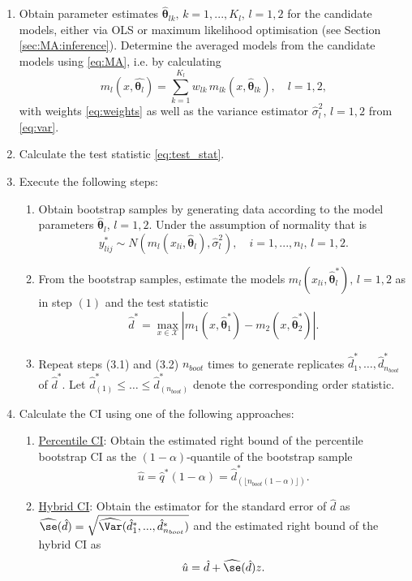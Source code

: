 {\begin{breakablealgorithm}
  \begin{enumerate}
      \item Obtain parameter estimates $\hat{\boldsymbol{\theta}}_{lk}, \, k=1,...,K_l, \, l = 1,2$ for the candidate models, either via OLS or maximum likelihood optimisation (see Section \ref{sec:MA:inference}). 
      Determine the averaged models from the candidate models using \eqref{eq:MA}, i.e. by calculating
      $$
      m_l(x, \hat{\boldsymbol{\theta}_l}) = \sum_{k=1}^{K_l} w_{lk} \, m_{lk}(x, \hat{\boldsymbol{\theta}}_{lk}), \quad l=1,2,
      $$ 
      with weights \eqref{eq:weights} as well as the variance estimator $\hat{\sigma}_l^2, \, l=1,2$ from \eqref{eq:var}.
      \item  Calculate the test statistic \eqref{eq:test_stat}.
	\item Execute the following steps:
			\begin{enumerate}[label=3.\arabic*]
				\item Obtain bootstrap samples by generating data according to the model parameters $\hat{\boldsymbol{\theta}}_{l}, \, l = 1,2$. Under the assumption of normality that is
    $$
    y^*_{lij} \sim N(m_l(x_{li}, \hat{\boldsymbol{\theta}}_{l}), \hat{\sigma}_l^2), \quad i=1,...,n_l, \, l=1,2.
    $$
				\item From the bootstrap samples, estimate the models  $m_{l}(x_{li}, \hat{\boldsymbol{\theta}}^{*}_{l}), \, l = 1, 2$ as in step $(1)$ and the test statistic
				\begin{equation}
				    \label{boot}
        \hat{d}^* = \max_{x \in \mathcal{X}}|m_{1}(x, \hat{\boldsymbol{\theta}}_{1}^{*}) - m_{2}(x, \hat{\boldsymbol{\theta}}_{2}^{*})|.
        \end{equation}
		\item Repeat steps (3.1) and (3.2) $n_{boot}$ times to generate replicates $\hat{d}^*_{1}, \dots, \hat{d}^*_{n_{boot}}$ of $\hat{d}^*$.
            Let $\hat{d}^*_{(1)} \leq \ldots \leq \hat{d}^*_{(n_{boot})}$
			denote the corresponding order statistic. 
            \end{enumerate}	
        \item Calculate the CI using one of the following approaches: 
\begin{enumerate}[label=\alph*]
				\item \underline{Percentile CI}: Obtain the estimated right bound of the percentile bootstrap CI as the $(1-\alpha)$-quantile of the bootstrap sample $$
\hat{u} = \hat{q}^*(1- \alpha)= \hat{d}^*_{(\lfloor n_{boot} (1-\alpha) \rfloor)}.
$$
    \item \underline{Hybrid CI}: Obtain the estimator for the standard error of $\hat{d}$ as $\widehat{\se}(\hat{d})= \sqrt{\widehat{\Var}(\hat{d}^*_1,...,\hat{d}^*_{n_{boot}})}$ and the estimated right bound of the hybrid CI as
    $$\hat{u} = \hat{d} + \widehat{\se}(\hat{d}) z.$$
            \end{enumerate}	


\end{enumerate}
\end{breakablealgorithm}}
